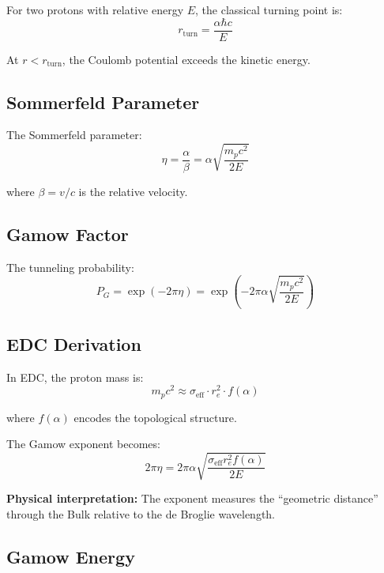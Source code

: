 \documentclass[12pt,a4paper]{article}
\begin{document}
For two protons with relative energy $E$, the classical turning point is:
\begin{equation}
r_{\text{turn}} = \frac{\alpha \hbar c}{E}
\end{equation}

At $r < r_{\text{turn}}$, the Coulomb potential exceeds the kinetic energy.

\subsection{Sommerfeld Parameter}

The Sommerfeld parameter:
\begin{equation}
\eta = \frac{\alpha}{\beta} = \alpha \sqrt{\frac{m_p c^2}{2E}}
\end{equation}

where $\beta = v/c$ is the relative velocity.

\subsection{Gamow Factor}

The tunneling probability:
\begin{equation}
P_G = \exp(-2\pi\eta) = \exp\left(-2\pi\alpha\sqrt{\frac{m_p c^2}{2E}}\right)
\end{equation}

\subsection{EDC Derivation}

In EDC, the proton mass is:
\begin{equation}
m_p c^2 \approx \sigma_{\text{eff}} \cdot r_e^2 \cdot f(\alpha)
\end{equation}

where $f(\alpha)$ encodes the topological structure.

The Gamow exponent becomes:
\begin{equation}
2\pi\eta = 2\pi\alpha\sqrt{\frac{\sigma_{\text{eff}} r_e^2 f(\alpha)}{2E}}
\end{equation}

\begin{insight}
\textbf{Physical interpretation:} The exponent measures the ``geometric distance'' through the Bulk relative to the de Broglie wavelength.
\end{insight}

\subsection{Gamow Energy}
\end{document}
